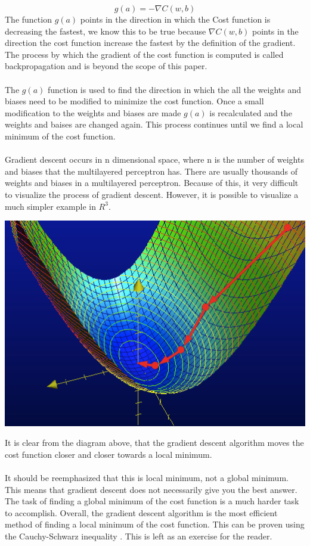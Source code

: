 $$
	g(a) = -\nabla C(w,b)
$$
The function $g(a)$ points in the direction in which the Cost function is decreasing the fastest, we know this to be true because $\nabla C(w,b)$ points in the direction the cost function increase the fastest by the definition of the gradient. The process by which the gradient of the cost function is computed is called backpropagation and is beyond the scope of this paper.\\ \\
The $g(a)$ function is used to find the direction in which the all the weights and biases need to be modified to minimize the cost function. Once a small modification to the weights and biases are made $g(a)$ is recalculated and the weights and baises are changed again. This process continues until we find a local minimum of the cost function.\\ \\
Gradient descent occurs in n dimensional space, where n is the number of weights and biases that the multilayered perceptron has. There are usually thousands of weights and biases in a multilayered perceptron. Because of this, it very difficult to visualize the process of gradient descent. However, it is possible to visualize a much simpler example in $R^3$.

\begin{center}
	\includegraphics[scale=0.5]{images/gradientdescent}
\end{center}
\cite{image3}
It is clear from the diagram above, that the gradient descent algorithm moves the cost function closer and closer towards a local minimum.\\ \\
It should be reemphasized that this is local minimum, not a global minimum. This means that gradient descent does not necessarily give you the best answer. The task of finding a global minimum of the cost function is a much harder task to accomplish. Overall, the gradient descent algorithm is the most efficient method of finding a local minimum of the cost function. This can be proven using the Cauchy-Schwarz inequality \cite{book}. This is left as an exercise for the reader. 
